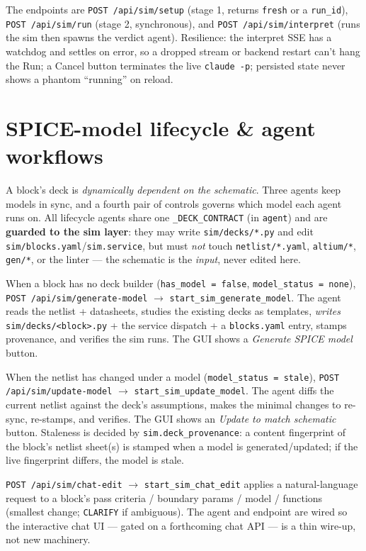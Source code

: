 \documentclass[11pt]{article}
\newcommand{\file}[1]{\texttt{#1}}
\newcommand{\mod}[1]{\texttt{#1}}
\begin{document}
\noindent The endpoints are \texttt{POST /api/sim/setup} (stage 1, returns
\texttt{fresh} or a \texttt{run\_id}), \texttt{POST /api/sim/run} (stage 2,
synchronous), and \texttt{POST /api/sim/interpret} (runs the sim then spawns the
verdict agent). Resilience: the interpret SSE has a watchdog and settles on
error, so a dropped stream or backend restart can't hang the Run; a Cancel button
terminates the live \texttt{claude -p}; persisted state never shows a phantom
``running'' on reload.

\section{SPICE-model lifecycle \& agent workflows}\label{sec:sim-lifecycle}

A block's deck is \emph{dynamically dependent on the schematic}. Three agents
keep models in sync, and a fourth pair of controls governs which model each agent
runs on. All lifecycle agents share one \texttt{\_DECK\_CONTRACT} (in \mod{agent})
and are \textbf{guarded to the sim layer}: they may write \file{sim/decks/*.py}
and edit \file{sim/blocks.yaml}/\mod{sim.service}, but must \emph{not} touch
\file{netlist/*.yaml}, \file{altium/*}, \file{gen/*}, or the linter --- the
schematic is the \emph{input}, never edited here.

\begin{description}[leftmargin=1.4em]
  \item[Generate (no model).] When a block has no deck builder
    (\texttt{has\_model = false}, \texttt{model\_status = none}),
    \texttt{POST /api/sim/generate-model} $\to$ \mod{start\_sim\_generate\_model}.
    The agent reads the netlist + datasheets, studies the existing decks as
    templates, \emph{writes} \file{sim/decks/<block>.py} + the service dispatch +
    a \file{blocks.yaml} entry, stamps provenance, and verifies the sim runs. The
    GUI shows a \emph{Generate SPICE model} button.
  \item[Update (stale).] When the netlist has changed under a model
    (\texttt{model\_status = stale}), \texttt{POST /api/sim/update-model} $\to$
    \mod{start\_sim\_update\_model}. The agent diffs the current netlist against
    the deck's assumptions, makes the minimal changes to re-sync, re-stamps, and
    verifies. The GUI shows an \emph{Update to match schematic} button. Staleness
    is decided by \mod{sim.deck\_provenance}: a content fingerprint of the block's
    netlist sheet(s) is stamped when a model is generated/updated; if the live
    fingerprint differs, the model is stale.
  \item[Chat-edit (foundation).] \texttt{POST /api/sim/chat-edit} $\to$
    \mod{start\_sim\_chat\_edit} applies a natural-language request to a block's
    pass criteria / boundary params / model / functions (smallest change;
    \texttt{CLARIFY} if ambiguous). The agent and endpoint are wired so the
    interactive chat UI --- gated on a forthcoming chat API --- is a thin
    wire-up, not new machinery.
\end{description}
\end{document}

